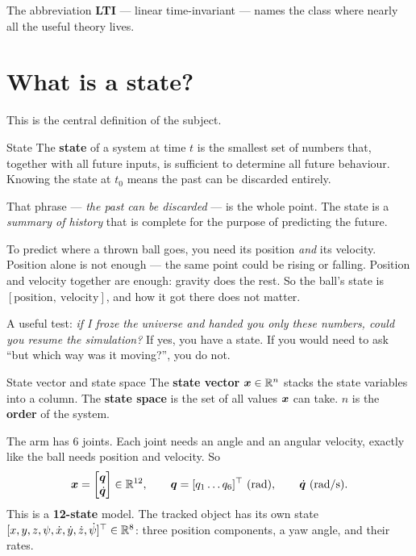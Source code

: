 The abbreviation \textbf{LTI} --- linear time-invariant --- names the class where nearly all the useful
theory lives.

\section{What is a state?}

This is the central definition of the subject.

\begin{definition}{State}
The \textbf{state} of a system at time $t$ is the smallest set of numbers that, together with all future
inputs, is sufficient to determine all future behaviour. Knowing the state at $t_0$ means the past can be
discarded entirely.
\end{definition}

That phrase --- \emph{the past can be discarded} --- is the whole point. The state is a \emph{summary of
history} that is complete for the purpose of predicting the future.

\begin{intuition}
To predict where a thrown ball goes, you need its position \emph{and} its velocity. Position alone is not
enough --- the same point could be rising or falling. Position and velocity together are enough: gravity
does the rest. So the ball's state is $[\text{position},\ \text{velocity}]$, and how it got there does not
matter.

A useful test: \emph{if I froze the universe and handed you only these numbers, could you resume the
simulation?} If yes, you have a state. If you would need to ask ``but which way was it moving?'', you do
not.
\end{intuition}

\begin{definition}{State vector and state space}
The \textbf{state vector} $\bm{x} \in \mathbb{R}^n$ stacks the state variables into a column. The \textbf{state
space} is the set of all values $\bm{x}$ can take. $n$ is the \textbf{order} of the system.
\end{definition}

\begin{inproject}
The arm has 6 joints. Each joint needs an angle and an angular velocity, exactly like the ball needs
position and velocity. So
\[
\bm{x} = \begin{bmatrix}\bm{q} \\ \dot{\bm{q}}\end{bmatrix} \in \mathbb{R}^{12},
\qquad \bm{q} = [q_1 \ldots q_6]^\top \ \text{(rad)},
\qquad \dot{\bm{q}} \ \text{(rad/s)}.
\]
This is a \textbf{12-state} model. The tracked object has its own state
$[x, y, z, \psi, \dot{x}, \dot{y}, \dot{z}, \dot{\psi}]^\top \in \mathbb{R}^8$: three position components, a yaw
angle, and their rates.
\end{inproject}

